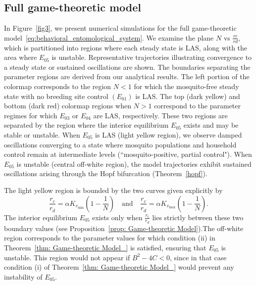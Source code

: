 \documentclass{article}
\theoremstyle{remark}
\theoremstyle{custom} %
\begin{document}
\subsection*{Full game-theoretic model}

In Figure~\ref{fig3}, we present numerical simulations for the full game-theoretic model~\eqref{eq:behavioral_entomological_system}. We examine the plane $N$ vs $\frac{rc}{rd}$, which is partitioned into regions where each steady state is LAS, along with the area where $E_{05}$ is unstable. Representative trajectories illustrating convergence to a steady state or sustained oscillations are shown.  The boundaries separating the parameter regions are derived from our analytical results. The left portion of the colormap corresponds to the region $N<1$ for which the mosquito-free steady state with no breeding site control $\left(E_{01}\right)$ is LAS. The top (dark yellow) and bottom (dark red) colormap regions when $N>1$ correspond to the parameter regimes for which $E_{03}$ or $E_{04}$ are LAS, respectively. These two regions are separated by the region where the interior equilibrium $E_{05}$ exists and may be stable or unstable.  When $E_{05}$ is LAS (light yellow region), we observe damped oscillations converging to a state where mosquito populations and household control remain at intermediate levels (``mosquito-positive, partial control"). When $E_{05}$ is unstable (central off-white region), the model trajectories exhibit sustained oscillations arising through the Hopf bifurcation (Theorem~\ref{hopf}). 
 
 The light yellow region is bounded by the two curves given explicitly by
\[
  \frac{r_c}{r_d} = \alpha K_{v_{\min}}\!\left(1-\frac{1}{N}\right)
  \quad \text{and} \quad
  \frac{r_c}{r_d} = \alpha K_{v_{\max}}\!\left(1-\frac{1}{N}\right).
\]
The interior equilibrium \(E_{05}\) exists only when \(\frac{r_c}{r_d}\) lies strictly between these two boundary values (see Proposition~\ref{prop: Game-theoretic Model}).The off-white region corresponds to the parameter values for which condition (ii) in Theorem~\ref{thm: Game-theoretic Model_} is satisfied, ensuring that \(E_{05}\) is unstable. This region would not appear if \(B^2 - 4C < 0\), since in that case condition (i) of Theorem~\ref{thm: Game-theoretic Model_} would prevent any instability of \(E_{05}\).
    
\end{document}
